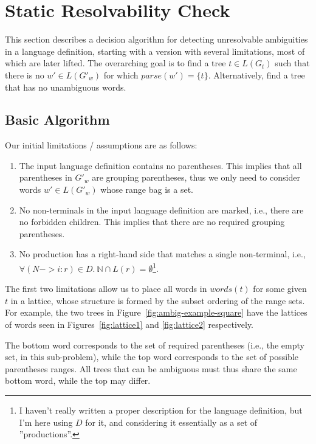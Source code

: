 \documentclass[sigplan]{acmart}\settopmatter{printfolios=true,printccs=false,printacmref=false}
\newcommand{\NT}{\mathbb{N}} %
\newcommand{\parse}{\mathit{parse}} %
\newcommand{\words}{\mathit{words}} %
\begin{document}
\section{Static Resolvability Check}

This section describes a decision algorithm for detecting unresolvable ambiguities in a language definition, starting with a version with several limitations, most of which are later lifted. The overarching goal is to find a tree $t \in L(G_t)$ such that there is no $w' \in L(G'_w)$ for which $\parse(w') = \{t\}$. Alternatively, find a tree that has no unambiguous words.

\subsection{Basic Algorithm}

Our initial limitations / assumptions are as follows:

\begin{enumerate}
  \item The input language definition contains no parentheses. This implies that all parentheses in $G'_w$ are grouping parentheses, thus we only need to consider words $w' \in L(G'_w)$ whose range bag is a set.

  \item No non-terminals in the input language definition are marked, i.e., there are no forbidden children. This implies that there are no required grouping parentheses.

  \item No production has a right-hand side that matches a single non-terminal, i.e., $\forall (N->i:r) \in D.\ \NT \cap L(r) = \emptyset$\footnote{I haven't really written a proper description for the language definition, but I'm here using $D$ for it, and considering it essentially as a set of ''productions''.}.
\end{enumerate}

\noindent The first two limitations allow us to place all words in $\words(t)$ for some given $t$ in a lattice, whose structure is formed by the subset ordering of the range sets. For example, the two trees in Figure~\ref{fig:ambig-example-square} have the lattices of words seen in Figures~\ref{fig:lattice1} and \ref{fig:lattice2} respectively.

The bottom word corresponds to the set of required parentheses (i.e., the empty set, in this sub-problem), while the top word corresponds to the set of possible parentheses ranges. All trees that can be ambiguous must thus share the same bottom word, while the top may differ.
\end{document}
